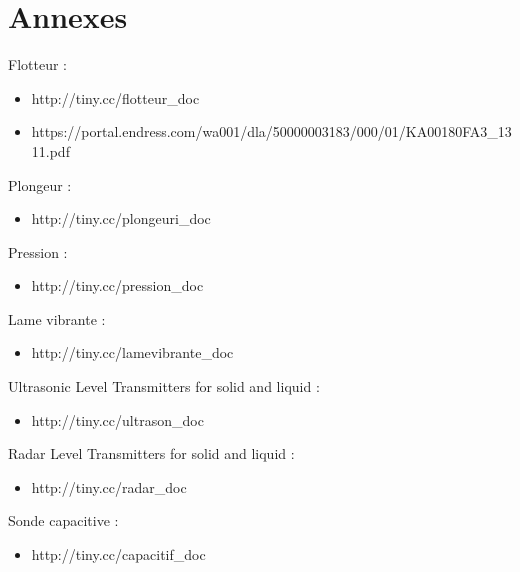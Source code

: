 \section{Annexes}

Flotteur :

\begin{itemize}
\item http://tiny.cc/flotteur\_doc
\item https://portal.endress.com/wa001/dla/50000003183/000/01/KA00180FA3\_1311.pdf
\end{itemize}

Plongeur :

\begin{itemize}
\item http://tiny.cc/plongeuri\_doc
\end{itemize}

Pression :

\begin{itemize}
\item http://tiny.cc/pression\_doc
\end{itemize}

Lame vibrante :

\begin{itemize}
\item http://tiny.cc/lamevibrante\_doc
\end{itemize}

Ultrasonic Level Transmitters for solid and liquid :

\begin{itemize}
\item http://tiny.cc/ultrason\_doc
\end{itemize}

Radar Level Transmitters for solid and liquid :

\begin{itemize}
\item http://tiny.cc/radar\_doc
\end{itemize}

Sonde capacitive :

\begin{itemize}
\item http://tiny.cc/capacitif\_doc
\end{itemize}
